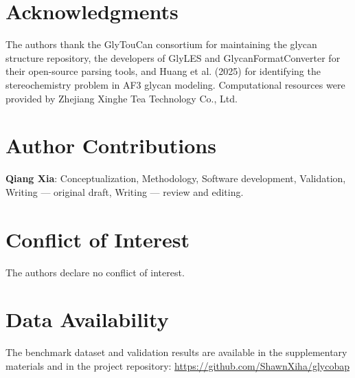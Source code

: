 \documentclass[11pt,a4paper]{article}
\begin{document}
\section*{Acknowledgments}

The authors thank the GlyTouCan consortium for maintaining the glycan structure repository, the developers of GlyLES and GlycanFormatConverter for their open-source parsing tools, and Huang et al. (2025) for identifying the stereochemistry problem in AF3 glycan modeling. Computational resources were provided by Zhejiang Xinghe Tea Technology Co., Ltd.

\section*{Author Contributions}

\textbf{Qiang Xia}: Conceptualization, Methodology, Software development, Validation, Writing --- original draft, Writing --- review and editing.

\section*{Conflict of Interest}

The authors declare no conflict of interest.

\section*{Data Availability}

The benchmark dataset and validation results are available in the supplementary materials and in the project repository: \url{https://github.com/ShawnXiha/glycobap}
\end{document}
